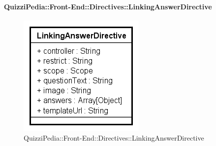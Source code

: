 		\paragraph{QuizziPedia::Front-End::Directives::LinkingAnswerDirective}
		
		\label{QuizziPedia::Front-End::Directives::LinkingAnswerDirective}
		
		\begin{figure}[ht]
			\centering
			\includegraphics[scale=0.80,keepaspectratio]{UML/Classi/Front-End/QuizziPedia_Front-end_Templates_LinkingAnswerTemplate.png}
			\caption{QuizziPedia::Front-End::Directives::LinkingAnswerDirective}
		\end{figure} \FloatBarrier		
		
